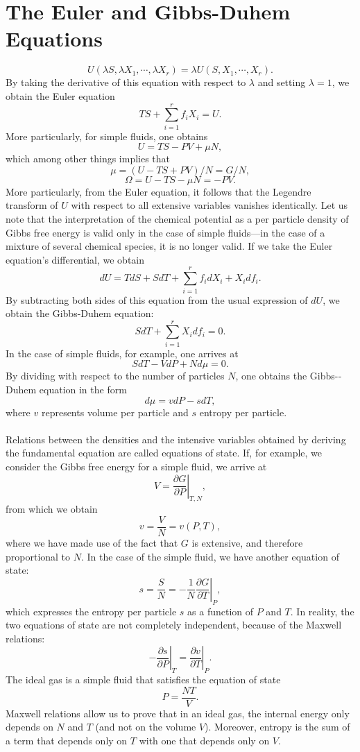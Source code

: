 \section{The Euler and Gibbs-­Duhem Equations}
\[U(\lambda S, \lambda X_1, \cdots, \lambda X_r) = \lambda U(S,X_1,\cdots,X_r).\]
By taking the derivative of this equation with respect to $\lambda$ and setting $\lambda = 1$, we obtain the Euler equation
\[TS + \sum_{i=1}^{r} f_i X_i = U.\]
More particularly, for simple fluids, one obtains
\[U = TS - PV + \mu N,\]
which among other things implies that
\[\mu = (U - TS + PV)/N = G/N,\]
\[\Omega = U - TS - \mu N = -PV.\]
More particularly, from the Euler equation, it follows that the Legendre transform of $U$ with respect to all extensive variables vanishes identically. Let us note that the interpretation of the chemical potential as a per particle density of Gibbs free energy is valid only in the case of simple fluids—in the case of a mixture of several chemical species, it is no longer valid.
If we take the Euler equation's differential, we obtain
\[dU = TdS + SdT + \sum_{i=1}^r f_idX_i + X_i df_i.\]
By subtracting both sides of this equation from the usual expression of $dU$, we obtain the Gibbs-­Duhem equation:
\[SdT + \sum_{i=1}^{r}X_idf_i = 0.\]
In the case of simple fluids, for example, one arrives at
\[SdT -VdP + Nd\mu = 0.\]
By dividing with respect to the number of particles $N$, one obtains the Gibbs-­Duhem equation in the form
\[d\mu = vdP -sdT,\]
where $v$ represents volume per particle and $s$ entropy per particle.
\\ \\
Relations between the densities and the intensive variables obtained by deriving the fundamental equation are called equations of state.
If, for example, we consider the Gibbs free energy for a simple fluid, we arrive at
\[ V = \left. \frac{\partial G}{\partial P} \right|_{T,N} ,\]
from which we obtain
\[v = \frac{V}{N} = v(P,T),\]
where we have made use of the fact that $G$ is extensive, and therefore proportional to $N$.
In the case of the simple fluid, we have another  equation of state:
\[s = \frac{S}{N} = -\frac{1}{N}  \left. \frac{\partial G}{\partial T} \right|_{P},\]
which expresses the entropy per particle $s$ as a function of $P$ and $T$. In reality, the two equations of state are not completely independent, because of the Maxwell relations:
\[\left. -\frac{\partial s}{\partial P} \right|_{T} = \left. \frac{\partial v}{\partial T} \right|_{P}.\]
The ideal gas is a simple fluid that satisfies the equation of state
\[P = \frac{NT}{V}.\]
Maxwell relations allow us to prove that in an ideal gas, the internal energy only depends on $N$ and $T$ (and not on the volume $V$). Moreover, entropy is the sum of a term that depends only on $T$ with one that depends only
on $V$.

